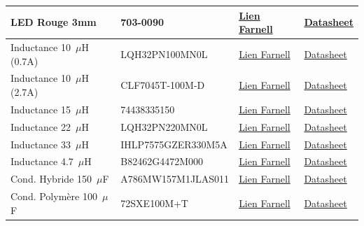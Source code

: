 \begin{tableau}[H]
{\begin{tabular}{|l|l|l|l|}
        \hline
        LED Rouge 3mm & 703-0090 & \href{https://fr.farnell.com/multicomp-pro/703-0090/led-rouge-3mm-standard/dp/2112100}{Lien Farnell} & \href{https://www.google.com/search?q=https://octopart.com/search\%3Fq\%3D703-0090}{Datasheet} \\
        \hline
        Inductance 10~$\mu$H (0.7A) & LQH32PN100MN0L & \href{https://fr.farnell.com/murata/lqh32pn100mn0l/inductance-10uh-blind-e-0-7a/dp/2470297}{Lien Farnell} & \href{https://www.google.com/search?q=https://octopart.com/search\%3Fq\%3DLQH32PN100MN0L}{Datasheet} \\
        \hline
        Inductance 10~$\mu$H (2.7A) & CLF7045T-100M-D & \href{https://fr.farnell.com/tdk/clf7045t-100m-d/inductance-10uh-2-7a-20-100khz/dp/2360939}{Lien Farnell} & \href{https://www.google.com/search?q=https://octopart.com/search\%3Fq\%3DCLF7045T-100M-D}{Datasheet} \\
        \hline
        Inductance 15~$\mu$H & 74438335150 & \href{https://fr.farnell.com/wurth-elektronik/74438335150/inductance-15uh-0-65a-20-pwr-14mhz/dp/2361924}{Lien Farnell} & \href{https://www.google.com/search?q=https://octopart.com/search\%3Fq\%3D74438335150}{Datasheet} \\
        \hline
        Inductance 22~$\mu$H & LQH32PN220MN0L & \href{https://fr.farnell.com/murata/lqh32pn220mn0l/inductance-22uh-blind-e-0-45a/dp/2470301}{Lien Farnell} & \href{https://www.google.com/search?q=https://octopart.com/search\%3Fq\%3DLQH32PN220MN0L}{Datasheet} \\
        \hline
        Inductance 33~$\mu$H & IHLP7575GZER330M5A & \href{https://fr.farnell.com/vishay/ihlp7575gzer330m5a/inductor-33uh-shielded-10-2a/dp/3778737}{Lien Farnell} & \href{https://www.google.com/search?q=https://octopart.com/search\%3Fq\%3DIHLP7575GZER330M5A}{Datasheet} \\
        \hline
        Inductance 4.7~$\mu$H & B82462G4472M000 & \href{https://fr.farnell.com/epcos/b82462g4472m000/inductance-4-7uh-blindee-2a/dp/3525402}{Lien Farnell} & \href{https://www.google.com/search?q=https://octopart.com/search\%3Fq\%3DB82462G4472M000}{Datasheet} \\
        \hline
        Cond. Hybride 150~$\mu$F & A786MW157M1JLAS011 & \href{https://fr.farnell.com/kemet/a786mw157m1jlas011/cond-alu-elec-hybride-150uf-63v/dp/4723928}{Lien Farnell} & \href{https://www.google.com/search?q=https://octopart.com/search\%3Fq\%3DA786MW157M1JLAS011}{Datasheet} \\
        \hline
        Cond. Polymère 100~$\mu$F & 72SXE100M+T & \href{https://fr.farnell.com/panasonic/72sxe100m-t/cond-alu-polym-re-100uf-72v-radial/dp/4568198}{Lien Farnell} & \href{https://www.google.com/search?q=https://octopart.com/search\%3Fq\%3D72SXE100M\%2BT}{Datasheet} \\

\end{tabular}}
\end{tableau}
